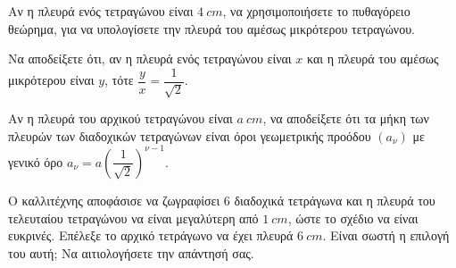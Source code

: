 \begin{alist}
\item

\begin{rlist}
\item Αν η πλευρά ενός τετραγώνου είναι $4\ cm$, να χρησιμοποιήσετε το πυθαγόρειο θεώρημα, για να υπολογίσετε την πλευρά του αμέσως μικρότερου τετραγώνου.
\item Να αποδείξετε ότι, αν η πλευρά ενός τετραγώνου είναι $x$ και η πλευρά του αμέσως μικρότερου είναι $y$, τότε $\dfrac{y}{x} = \dfrac{1}{\sqrt{2}}$.
\end{rlist}
\item Αν η πλευρά του αρχικού τετραγώνου είναι $a\ cm$, να αποδείξετε ότι τα μήκη των πλευρών των διαδοχικών τετραγώνων είναι όροι γεωμετρικής προόδου $\left(a_{\nu}\right)$ με γενικό όρο $a_{\nu} = a \left(\dfrac{1}{\sqrt{2}}\right)^{\nu - 1}$.
\item Ο καλλιτέχνης αποφάσισε να ζωγραφίσει 6 διαδοχικά τετράγωνα και η πλευρά του τελευταίου τετραγώνου να είναι μεγαλύτερη από $1\ cm$, ώστε το σχέδιο να είναι ευκρινές. Επέλεξε το αρχικό τετράγωνο να έχει πλευρά $6\ cm$. Είναι σωστή η επιλογή του αυτή; Να αιτιολογήσετε την απάντησή σας.
\end{alist}

